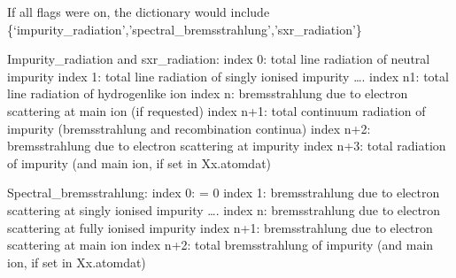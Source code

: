 \documentclass[letterpaper,10pt,english]{sphinxmanual}
\begin{document}
\begin{fulllineitems}
\begin{description}
\begin{description}
If all flags were on, the dictionary would include
\{‘impurity\_radiation’,’spectral\_bremsstrahlung’,’sxr\_radiation’\}

Impurity\_radiation and sxr\_radiation:
index 0: total line radiation of neutral impurity
index 1: total line radiation of singly ionised impurity
….
index n\sphinxhyphen{}1: total line radiation of hydrogen\sphinxhyphen{}like ion
index n: bremsstrahlung due to electron scattering at main ion (if requested)
index n+1: total continuum radiation of impurity (bremsstrahlung and recombination continua)
index n+2: bremsstrahlung due to electron scattering at impurity
index n+3: total radiation of impurity (and main ion, if set in Xx.atomdat)

Spectral\_bremsstrahlung:
index 0: = 0
index 1: bremsstrahlung due to electron scattering at singly ionised impurity
….
index n: bremsstrahlung due to electron scattering at fully ionised impurity
index n+1: bremsstrahlung due to electron scattering at main ion
index n+2: total bremsstrahlung of impurity (and main ion, if set in Xx.atomdat)

\end{description}

\end{description}

\end{fulllineitems}

\end{document}

